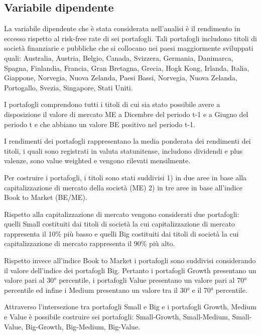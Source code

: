 \subsection{Variabile dipendente}

La variabile dipendente che è stata considerata nell'analisi è il rendimento in eccesso rispetto al risk-free rate di sei portafogli. Tali portafogli includono titoli di società finanziarie e pubbliche che si collocano nei paesi maggiormente sviluppati quali: Australia, Austria, Belgio, Canada, Svizzera, Germania, Danimarca, Spagna, Finlandia, Francia, Gran Bretagna, Grecia, Hogk Kong, Irlanda, Italia, Giappone, Norvegia, Nuova Zelanda, Paesi Bassi, Norvegia, Nuova Zelanda, Portogallo, Svezia, Singapore, Stati Uniti. 

I portafogli comprendono tutti i titoli di cui sia stato possibile avere a disposizione il valore di mercato ME a Dicembre del periodo t-1 e a Giugno del periodo t e che abbiano un valore BE positivo nel periodo t-1. 

I rendimenti dei portafogli rappresentano la media ponderata dei rendimenti dei titoli, i quali sono registrati in valuta statunitense, includono dividendi e plus valenze, sono value weighted e vengono rilevati mensilmente.

Per costruire i portafogli, i titoli sono stati suddivisi 1) in due aree in base alla capitalizzazione di mercato della società (ME) 2) in tre aree in base all'indice Book to Market (BE/ME). 

Rispetto alla capitalizzazione di mercato vengono considerati due portafogli: quelli Small costituiti dai titoli di società la cui capitalizzazione di mercato rappresenta il 10\% più basso e quelli Big costituiti dai titoli di società la cui capitalizzazione di mercato rappresenta il 90\% più alto.

Rispetto invece all'indice Book to Market i portafogli sono suddivisi considerando il valore dell'indice dei portafogli Big. Pertanto i portafogli Growth presentano un valore pari al 30° percentile, i portafogli Value presentano un valore pari al 70° percentile ed infine i Medium presentano un valore tra il 30° e il 70° percentile. 

Attraverso l'intersezione tra portafogli Small e Big e i portafogli Growth, Medium e Value è possibile costruire sei portafogli:  Small-Growth, Small-Medium, Small-Value, Big-Growth, Big-Medium, Big-Value.

